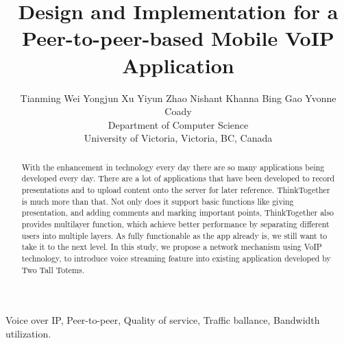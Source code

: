\documentclass[conference]{IEEEtran}
\title{Design and Implementation for a Peer-to-peer-based Mobile VoIP Application}
\author{\qquad Tianming Wei \qquad Yongjun Xu \qquad Yiyun Zhao \qquad Nishant Khanna \qquad Bing Gao \qquad Yvonne Coady\\
Department of Computer Science\\
University of Victoria, Victoria, BC, Canada\\}
\begin{document}
\maketitle
\pagestyle{plain}

\begin{abstract}
With the enhancement in technology every day there are so many applications being developed every day. There are a lot of applications that have been developed to record presentations and to upload content onto the server for later reference. ThinkTogether is much more than that. Not only does it support basic functions like giving presentation, and adding comments and marking important points, ThinkTogether also provides multilayer function, which achieve better performance by separating different users into multiple layers. As fully functionable as the app already is, we still want to take it to the next level. In this study, we propose a network mechanism using VoIP technology, to introduce voice streaming feature into existing application developed by Two Tall Totems.

\end{abstract}

\begin{IEEEkeywords}
  Voice over IP, Peer-to-peer, Quality of service, Traffic ballance, Bandwidth utilization.
\end{IEEEkeywords}










\end{document}

